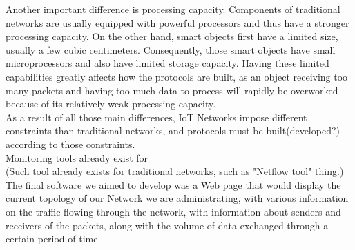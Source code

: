 Another important difference is processing capacity. Components of traditional networks are usually equipped with powerful processors and thus have a stronger processing capacity. On the other hand, smart objects first have a limited size, usually a few cubic centimeters. Consequently, those smart objects have small microprocessors and also have limited storage capacity. Having these limited capabilities greatly affects how the protocols are built, as an object receiving too many packets and having too much data to process will rapidly be overworked because of its relatively weak processing capacity. \\ 

As a result of all those main differences, IoT Networks impose different constraints than traditional networks, and protocols must be built(developed?) according to those constraints.\\

Monitoring tools already exist for \\

(Such tool already exists for traditional networks, such as "Netflow tool" thing.)\\

The final software we aimed to develop was a Web page that would display the current topology of our Network we are administrating, with various information on the traffic flowing through the network, with information about senders and receivers of the packets, along with the volume of data exchanged through a certain period of time. 